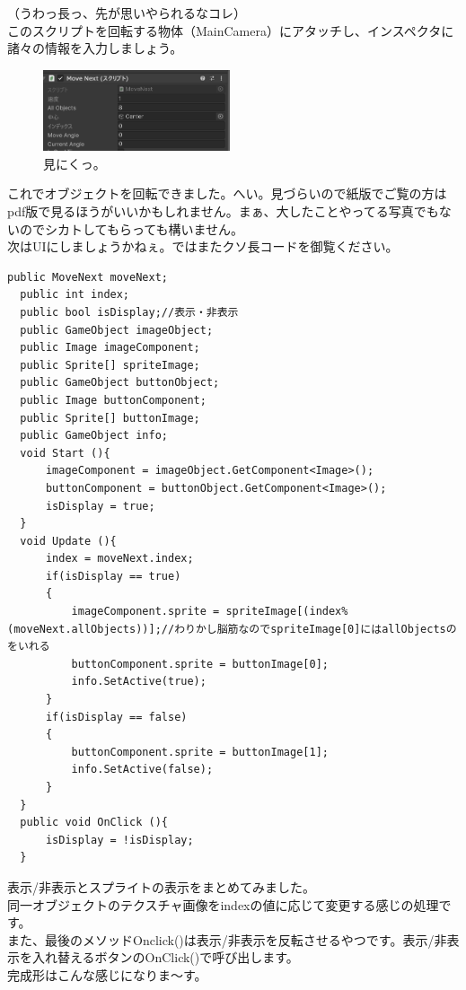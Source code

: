 \documentclass[b5paper,9pt,platex,dvipdfmx]{jsarticle}
\begin{document}
\begin{multicols*}{3}
（うわっ長っ、先が思いやられるなコレ）\\
このスクリプトを回転する物体（MainCamera）にアタッチし、インスペクタに諸々の情報を入力しましょう。\\
\begin{figure}[H]
  \centering
  \includegraphics[width=5.5cm]{4.png}
  \caption{見にくっ。}
\end{figure}
これでオブジェクトを回転できました。へい。見づらいので紙版でご覧の方はpdf版で見るほうがいいかもしれません。まぁ、大したことやってる写真でもないのでシカトしてもらっても構いません。\\
次はUIにしましょうかねぇ。ではまたクソ長コードを御覧ください。\\
\begin{lstlisting}[caption=UIDraw.cs]
  public MoveNext moveNext;
  public int index;
  public bool isDisplay;//表示・非表示
  public GameObject imageObject;
  public Image imageComponent;
  public Sprite[] spriteImage;
  public GameObject buttonObject;
  public Image buttonComponent;
  public Sprite[] buttonImage;
  public GameObject info;
  void Start (){
      imageComponent = imageObject.GetComponent<Image>();
      buttonComponent = buttonObject.GetComponent<Image>();
      isDisplay = true;
  }
  void Update (){
      index = moveNext.index;
      if(isDisplay == true)
      {
          imageComponent.sprite = spriteImage[(index%(moveNext.allObjects))];//わりかし脳筋なのでspriteImage[0]にはallObjectsのをいれる
          buttonComponent.sprite = buttonImage[0];
          info.SetActive(true);
      }
      if(isDisplay == false)
      {
          buttonComponent.sprite = buttonImage[1];
          info.SetActive(false);
      }
  }
  public void OnClick (){
      isDisplay = !isDisplay;
  }
\end{lstlisting}
表示/非表示とスプライトの表示をまとめてみました。\\
同一オブジェクトのテクスチャ画像をindexの値に応じて変更する感じの処理です。\\
また、最後のメソッドOnclick()は表示/非表示を反転させるやつです。表示/非表示を入れ替えるボタンのOnClick()で呼び出します。\\
完成形はこんな感じになりま～す。\\

\end{multicols*}
\end{document}
